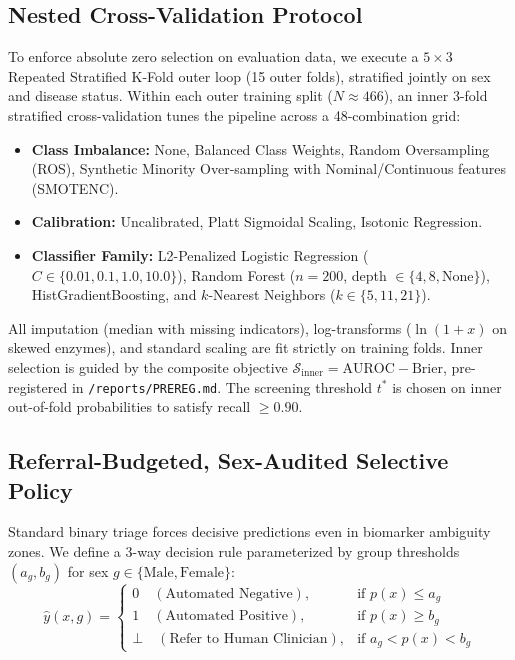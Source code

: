 \documentclass[11pt,a4paper]{article}
\begin{document}
\subsection{Nested Cross-Validation Protocol}
To enforce absolute zero selection on evaluation data, we execute a $5\times 3$ Repeated Stratified K-Fold outer loop (15 outer folds), stratified jointly on sex and disease status. Within each outer training split ($N \approx 466$), an inner 3-fold stratified cross-validation tunes the pipeline across a 48-combination grid:
\begin{itemize}
    \item \textbf{Class Imbalance:} None, Balanced Class Weights, Random Oversampling (ROS), Synthetic Minority Over-sampling with Nominal/Continuous features (SMOTENC).
    \item \textbf{Calibration:} Uncalibrated, Platt Sigmoidal Scaling, Isotonic Regression.
    \item \textbf{Classifier Family:} L2-Penalized Logistic Regression ($C \in \{0.01, 0.1, 1.0, 10.0\}$), Random Forest ($n=200$, depth $\in \{4, 8, \text{None}\}$), HistGradientBoosting, and $k$-Nearest Neighbors ($k \in \{5, 11, 21\}$).
\end{itemize}

\noindent All imputation (median with missing indicators), log-transforms ($\ln(1+x)$ on skewed enzymes), and standard scaling are fit strictly on training folds. Inner selection is guided by the composite objective $\mathcal{S}_{\text{inner}} = \text{AUROC} - \text{Brier}$, pre-registered in \texttt{/reports/PREREG.md}. The screening threshold $t^*$ is chosen on inner out-of-fold probabilities to satisfy recall $\ge 0.90$.

\subsection{Referral-Budgeted, Sex-Audited Selective Policy}
Standard binary triage forces decisive predictions even in biomarker ambiguity zones. We define a 3-way decision rule parameterized by group thresholds $(a_g, b_g)$ for sex $g \in \{\text{Male}, \text{Female}\}$:
\begin{equation}
    \hat{y}(x, g) = \begin{cases}
        0 \quad (\text{Automated Negative}), & \text{if } p(x) \le a_g \\
        1 \quad (\text{Automated Positive}), & \text{if } p(x) \ge b_g \\
        \bot \quad (\text{Refer to Human Clinician}), & \text{if } a_g < p(x) < b_g
    \end{cases}
\end{equation}
\end{document}
